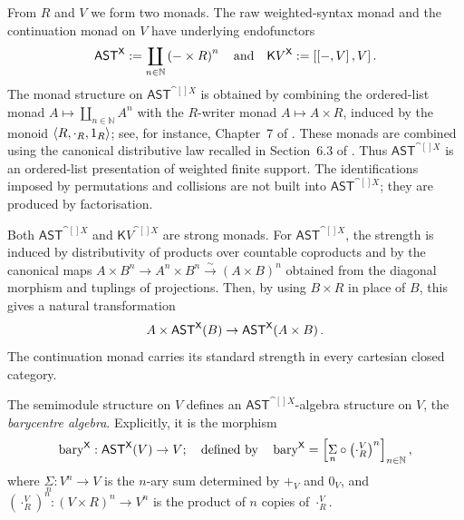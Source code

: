 \documentclass[11pt,a4paper]{article}
\theoremstyle{definition}
\theoremstyle{remark}
\providecommand{\N}{\mathbb{N}}
\providecommand{\AST}{\mathsf{AST}}
\providecommand{\blankdash}{\mathord{-}}
\providecommand{\bary}{\operatorname{bary}}
\providecommand{\cont}{\mathsf{K}}
\providecommand{\runit}{1_R}
\providecommand{\rcdot}{\cdot_R}
\providecommand{\vplus}{+_V}
\providecommand{\vzero}{0_V}
\providecommand{\vrdot}{\cdot_R^V}
\begin{document}
From \(R\) and \(V\) we form two monads. The raw weighted-syntax monad and the
continuation monad on \(V\) have underlying endofunctors
\begin{equation}
	\label{eq:definition-ast-continuation-general}
	\AST^{\cat[]{X}} := \coprod_{n \in \N} \left( \blankdash \times R \right)^{n}
	\qq{and}
	\cont{V}^{\cat[]{X}} := \inthom{\inthom{\blankdash}{V}}{V}.
\end{equation}
The monad structure on \( \AST^{\cat[]{X}} \) is obtained by combining the
ordered-list monad \( A\mapsto\coprod_{n\in\N}A^n \)
\cite{dubucFreeMonoids1974} with the \(R\)-writer monad
\(A\mapsto A\times R\), induced by the monoid
\( \tuple{R,\rcdot,\runit} \); see, for instance, Chapter~7 of
\cite{maclaneCategoriesWorkingMathematician1997}. These monads are combined
using the canonical distributive law recalled in
Section~6.3 of \cite{bacciSumTensorQuantitative2024}. Thus
\( \AST^{\cat[]{X}} \) is an ordered-list presentation of weighted finite
support. The identifications imposed by permutations and collisions are not
built into \( \AST^{\cat[]{X}} \); they are produced by factorisation.

Both \( \AST^{\cat[]{X}} \) and \( \cont{V}^{\cat[]{X}} \) are strong monads.
For \( \AST^{\cat[]{X}} \), the strength is induced by distributivity of
products over countable coproducts and by the canonical maps \( A \times B^{n} \to A^{n} \times B^{n} \xrightarrow{\sim} \left( A \times B \right)^{n} \) obtained from the diagonal morphism and tuplings of projections. Then, by using \(B\times R\) in place of \(B\), this gives a natural
transformation
\begin{equation*}
A \times \Fun[nn]{ \AST^{\cat[]{X}} }{ B }
\to
\Fun[np]{ \AST^{\cat[]{X}} }{ A \times B }.
\end{equation*}
The continuation monad carries its standard strength in every cartesian closed
category.

The semimodule structure on \(V\) defines an
\( \AST^{\cat[]{X}} \)-algebra structure on \(V\), the
\emph{barycentre algebra}. Explicitly, it is the morphism
\begin{equation}
	\label{eq:definition-barycentre-algebra-general}
\bary^{\cat[]{X}}:
\Fun[nn]{ \AST^{\cat[]{X}} }{ V }
\to V;
\quad
\textnormal{defined by}
\quad
	\bary^{\cat[]{X}}
	=
	\cotupling{\underset{n}{\Sigma} \circ \left( \vrdot \right)^{n}}_{n \in \N},
\end{equation}
where \( \underset{n}{\Sigma}:V^n\to V \) is the \(n\)-ary sum determined by
\( \vplus \) and \( \vzero \), and
\( \left(\vrdot\right)^n:(V\times R)^n\to V^n \) is the product of \(n\)
copies of \( \vrdot \).
\end{document}
